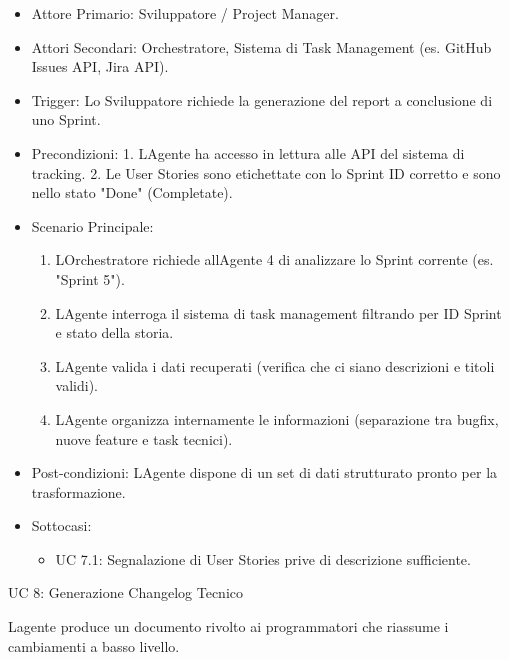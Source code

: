 \documentclass[12pt, a4paper]{article}
\begin{document}
\begin{itemize}
\item
  Attore Primario: Sviluppatore / Project Manager.
\item
  Attori Secondari: Orchestratore, Sistema di Task Management (es.
  GitHub Issues API, Jira API).
\item
  Trigger: Lo Sviluppatore richiede la generazione del report a
  conclusione di uno Sprint.
\item
  Precondizioni: 1. L\textquotesingle Agente ha accesso in lettura alle
  API del sistema di tracking. 2. Le User Stories sono etichettate con
  lo Sprint ID corretto e sono nello stato "Done" (Completate).
\item
  Scenario Principale:

  \begin{enumerate}
  \item
    L\textquotesingle Orchestratore richiede all\textquotesingle Agente
    4 di analizzare lo Sprint corrente (es. "Sprint 5").
  \item
    L\textquotesingle Agente interroga il sistema di task management
    filtrando per ID Sprint e stato della storia.
  \item
    L\textquotesingle Agente valida i dati recuperati (verifica che ci
    siano descrizioni e titoli validi).
  \item
    L\textquotesingle Agente organizza internamente le informazioni
    (separazione tra bugfix, nuove feature e task tecnici).
  \end{enumerate}
\item
  Post-condizioni: L\textquotesingle Agente dispone di un set di dati
  strutturato pronto per la trasformazione.
\item
  Sottocasi:

  \begin{itemize}
  \item
    UC 7.1: Segnalazione di User Stories prive di descrizione
    sufficiente.
  \end{itemize}
\end{itemize}

UC 8: Generazione Changelog Tecnico

L\textquotesingle agente produce un documento rivolto ai programmatori
che riassume i cambiamenti a basso livello.
\end{document}
